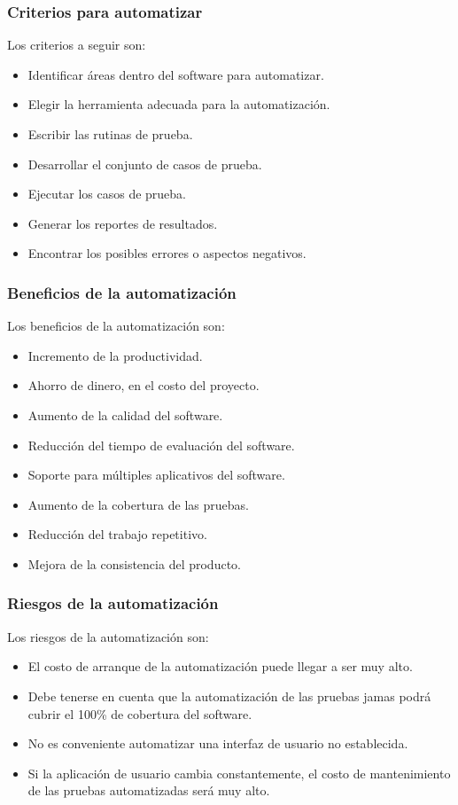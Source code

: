 \documentclass{beamer}
\begin{document}
\begin{frame}
\frametitle{Criterios para automatizar}
Los criterios a seguir son:
\begin{itemize}
    \item Identificar áreas dentro del software para automatizar.
    \item Elegir la herramienta adecuada para la automatización.
    \item Escribir las rutinas de prueba.
    \item Desarrollar el conjunto de casos de prueba.
    \item Ejecutar los casos de prueba.
    \item Generar los reportes de resultados.
    \item Encontrar los posibles errores o aspectos negativos.
\end{itemize}
\end{frame}

\begin{frame}
\frametitle{Beneficios de la automatización}
Los beneficios de la automatización son:
\begin{itemize}
    \item Incremento de la productividad.
    \item Ahorro de dinero, en el costo del proyecto.
    \item Aumento de la calidad del software.
    \item Reducción del tiempo de evaluación del software.
    \item Soporte para múltiples aplicativos del software.
    \item Aumento de la cobertura de las pruebas.
    \item Reducción del trabajo repetitivo.
    \item Mejora de la consistencia del producto.
\end{itemize}
\end{frame}

\begin{frame}
\frametitle{Riesgos de la automatización}
Los riesgos de la automatización son:
\begin{itemize}
    \item El costo de arranque de la automatización puede llegar a ser muy alto.
    \item Debe tenerse en cuenta que la automatización de las pruebas jamas
        podrá cubrir el 100\% de cobertura del software.
    \item No es conveniente automatizar una interfaz de usuario no establecida.
    \item Si la aplicación de usuario cambia constantemente, el costo de
        mantenimiento de las pruebas automatizadas será muy alto.
\end{itemize}
\end{frame}
\end{document}
